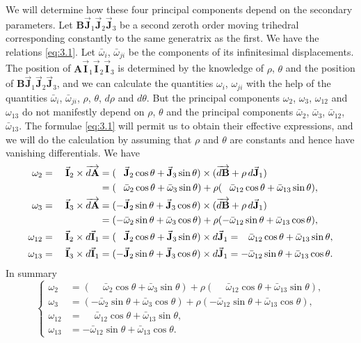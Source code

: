 \documentclass[leqno,11pt]{book}
\numberwithin{equation}{chapter}
\theoremstyle{shape1}
\theoremstyle{shapesmall}
\newcommand{\rvec}[1]{\vec{\mathbf{#1}}}
\newcommand{\ivec}{\rvec{I}}
\newcommand{\jvec}{\rvec{J}}
\begin{document}
We will determine how these four principal components depend on the secondary parameters. Let $\mathbf{B}\jvec_{1}\jvec_{2}\jvec_{3}$ be a second zeroth order moving trihedral corresponding constantly to the same generatrix as the first. We have the relations \eqref{eq:3.1}. Let $\bar\omega_{i}$, $\bar\omega_{ji}$ be the components of its infinitesimal displacements. The position of $\mathbf{A}\ivec_{1}\ivec_{2}\ivec_{3}$ is determined by the knowledge of $\rho$, $\theta$ and the position of $\mathbf{B}\jvec_{1}\jvec_{2}\jvec_{3}$, and we can calculate the quantities $\omega_{i}$, $\omega_{ji}$ with the help of the quantities $\bar\omega_{i}$, $\bar\omega_{ji}$, $\rho$, $\theta$, $d\rho$ and $d\theta$. But the principal components $\omega_{2}$, $\omega_{3}$, $\omega_{12}$ and $\omega_{13}$ do not manifestly depend on $\rho$, $\theta$ and the principal components $\bar \omega_{2}$, $\bar\omega_{3}$, $\bar\omega_{12}$, $\bar\omega_{13}$. The formulae \eqref{eq:3.1} will permit us to obtain their effective expressions, and we will do the calculation by assuming that $\rho$ and $\theta$ are constants and hence have vanishing differentials. We have
\begin{alignat*}{5}
  \omega_{2}&{}={}&{}\ivec_{2}\times\overrightarrow{d\mathbf{A}}&=(\hphantom{+}\jvec_{2}\cos\theta+\jvec_{3}\sin\theta)\times(\overrightarrow{d\mathbf{B}}+\rho\,d\jvec_{1})\\
  &&&=(\phantom{+}\bar\omega_{2}\cos\theta+\bar\omega_{3}\sin\theta)+\rho(\hphantom{+}\bar\omega_{12}\cos\theta+\bar\omega_{13}\sin\theta),\\
  \omega_{3}&{}={}&{}\ivec_{3}\times\overrightarrow{d\mathbf{A}}&=(-\jvec_{2}\sin\theta+\jvec_{3}\cos\theta)\times(\overrightarrow{d\mathbf{B}}+\rho\,d\jvec_{1})\\
  &&&=({-}\bar\omega_{2}\sin\theta+\bar\omega_{3}\cos\theta)+\rho(-\bar\omega_{12}\sin\theta+\bar\omega_{13}\cos\theta),\\
  \omega_{12}&{}={}&{}\ivec_{2}\times d\ivec_{1}&=(\phantom{+}\jvec_{2}\cos\theta+\jvec_{3}\sin\theta)\times d\jvec_{1}=\phantom{+}\bar\omega_{12}\cos\theta+\bar\omega_{13}\sin\theta,\\
  \omega_{13}&{}={}&{}\ivec_{3}\times d\ivec_{1}&=({-}\jvec_{2}\sin\theta+\jvec_{3}\cos\theta)\times d\jvec_{1}={-}\bar\omega_{12}\sin\theta+\bar\omega_{13}\cos\theta.
\end{alignat*}
In summary
\begin{equation}
  \label{eq:3.2}
  \left\{
    \begin{aligned}
      \omega_{2}&=(\phantom{+}\bar\omega_{2}\cos\theta+\bar\omega_{3}\sin\theta)+\rho(\phantom{+}\bar\omega_{12}\cos\theta+\bar\omega_{13}\sin\theta),\\
      \omega_{3}&=({-}\bar\omega_{2}\sin\theta+\bar\omega_{3}\cos\theta)+\rho({-}\bar\omega_{12}\sin\theta+\bar\omega_{13}\cos\theta),\\
      \omega_{12}&=\phantom{+}\bar\omega_{12}\cos\theta+\bar\omega_{13}\sin\theta,\\
      \omega_{13}&={-}\bar\omega_{12}\sin\theta+\bar\omega_{13}\cos\theta.
    \end{aligned}
  \right.
\end{equation}
\end{document}
